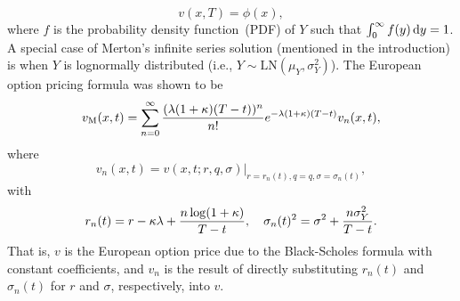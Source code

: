 	\begin{equation}
		\label{eqn:PIDEcondition}
		v(x,T) = \phi(x),
	\end{equation}
where $f$ is the probability density function~(PDF) of $Y$ such that $\int_0^\infty f(y) \, \mathrm d y = 1$. A special case of Merton's infinite series solution (mentioned in the introduction) is when $Y$ is lognormally distributed (i.e., $Y \sim \text{LN}(\mu_Y,\sigma_Y^2)$). The European option pricing formula was shown to be
	\begin{equation}
		\label{eqn:mertonSoln}
		v_{\text{M}}(x,t) = \displaystyle\sum\limits_{n=0}^\infty \frac{(\lambda(1+\kappa)(T-t))^n}{n!}e^{-\lambda(1+\kappa)(T-t)}v_n(x,t),
	\end{equation}
where
	\begin{equation*}
		v_n(x,t) = \left. v(x,t; r,q,\sigma) \right\vert_{r = r_n(t), q = q, \sigma = \sigma_n(t)},
	\end{equation*}
with
	\begin{equation}
		\label{eqn:rs}
		r_n(t) = r - \kappa\lambda + \frac{n\log(1+\kappa)}{T-t}, \quad \sigma_n(t)^{2} = \sigma^2 + \frac{n\sigma_Y^2}{T-t}.
	\end{equation}
That is, $v$ is the European option price due to the Black-Scholes formula with constant coefficients, and $v_n$ is the result of directly substituting $r_n(t)$ and $\sigma_n(t)$ for $r$ and $\sigma$, respectively, into $v$.

